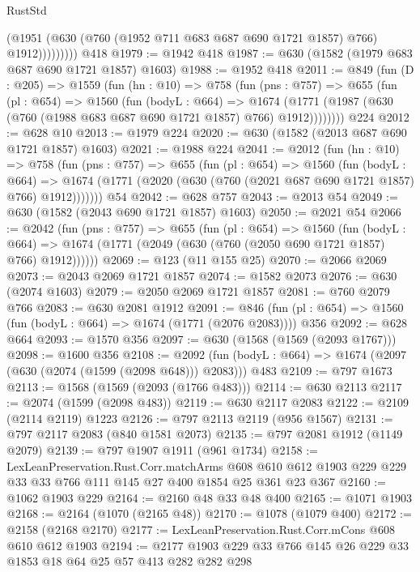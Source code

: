 \begin{lexlean}{RustStd}
\begin{coremodule}
                  (@1951 (@630 (@760 (@1952 @711 @683 @687 @690 @1721 @1857) @766) @1912)))))))))
    @418
@1979 := @1942 @418
@1987 := @630 (@1582 (@1979 @683 @687 @690 @1721 @1857) @1603)
@1988 := @1952 @418
@2011 := @849
    (fun (D : @205) =>
    @1559
      (fun (hn : @10) =>
      @758
        (fun (pns : @757) =>
        @655
          (fun (pl : @654) =>
          @1560
            (fun (bodyL : @664) =>
            @1674 (@1771 (@1987 (@630 (@760 (@1988 @683 @687 @690 @1721 @1857) @766) @1912))))))))
    @224
@2012 := @628 @10
@2013 := @1979 @224
@2020 := @630 (@1582 (@2013 @687 @690 @1721 @1857) @1603)
@2021 := @1988 @224
@2041 := @2012
    (fun (hn : @10) =>
    @758
      (fun (pns : @757) =>
      @655
        (fun (pl : @654) =>
        @1560
          (fun (bodyL : @664) =>
          @1674 (@1771 (@2020 (@630 (@760 (@2021 @687 @690 @1721 @1857) @766) @1912)))))))
    @54
@2042 := @628 @757
@2043 := @2013 @54
@2049 := @630 (@1582 (@2043 @690 @1721 @1857) @1603)
@2050 := @2021 @54
@2066 := @2042
    (fun (pns : @757) =>
    @655
      (fun (pl : @654) =>
      @1560
        (fun (bodyL : @664) =>
        @1674 (@1771 (@2049 (@630 (@760 (@2050 @690 @1721 @1857) @766) @1912))))))
@2069 := @123 (@11 @155 @25)
@2070 := @2066 @2069
@2073 := @2043 @2069 @1721 @1857
@2074 := @1582 @2073
@2076 := @630 (@2074 @1603)
@2079 := @2050 @2069 @1721 @1857
@2081 := @760 @2079 @766
@2083 := @630 @2081 @1912
@2091 := @846 (fun (pl : @654) => @1560 (fun (bodyL : @664) => @1674 (@1771 (@2076 @2083)))) @356
@2092 := @628 @664
@2093 := @1570 @356
@2097 := @630 (@1568 (@1569 (@2093 @1767)))
@2098 := @1600 @356
@2108 := @2092 (fun (bodyL : @664) => @1674 (@2097 (@630 (@2074 (@1599 (@2098 @648))) @2083))) @483
@2109 := @797 @1673
@2113 := @1568 (@1569 (@2093 (@1766 @483)))
@2114 := @630 @2113
@2117 := @2074 (@1599 (@2098 @483))
@2119 := @630 @2117 @2083
@2122 := @2109 (@2114 @2119) @1223
@2126 := @797 @2113 @2119 (@956 @1567)
@2131 := @797 @2117 @2083 (@840 @1581 @2073)
@2135 := @797 @2081 @1912 (@1149 @2079)
@2139 := @797 @1907 @1911 (@961 @1734)
@2158 := LexLeanPreservation.Rust.Corr.matchArms
    @608
    @610
    @612
    @1903
    @229
    @229
    @33
    @33
    @766
    @111
    @145
    @27
    @400
    @1854
    @25
    @361
    @23
    @367
@2160 := @1062 @1903 @229
@2164 := @2160 @48 @33 @48 @400
@2165 := @1071 @1903
@2168 := @2164 (@1070 (@2165 @48))
@2170 := @1078 (@1079 @400)
@2172 := @2158 (@2168 @2170)
@2177 := LexLeanPreservation.Rust.Corr.mCons @608 @610 @612 @1903
@2194 := @2177 @1903 @229 @33 @766 @145 @26 @229 @33 @1853 @18 @64 @25 @57 @413 @282 @282 @298

\end{coremodule}
\end{lexlean}
